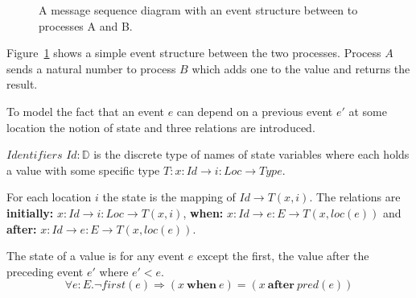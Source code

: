 \begin{figure}
  \center
  \label{fig:sequence}
  \caption{A message sequence diagram with an event structure between to
    processes A and B.}
\end{figure}

Figure~\ref{fig:sequence} shows a simple event structure between the two
processes. Process $A$ sends a natural number to process $B$ which adds
one to the value and returns the result.

To model the fact that an event $e$ can depend on a previous event $e'$ at
some location the notion of state and three relations are introduced.~\cite{bickford2005causal}

\begin{defi}
  $Identifiers$ $Id:\mathbb{D}$ is the discrete type of names of state variables where each
  holds a value with some specific type $T:x:Id\rightarrow i:Loc\rightarrow Type$.
\end{defi}

\begin{defi}
  For each location $i$ the state is the mapping of $Id\rightarrow T(x,i)$.
  The relations are \textbf{initially:} $x:Id\rightarrow i:Loc\rightarrow T(x,i)$,
  \textbf{when:} $x:Id\rightarrow e:E\rightarrow T(x,loc(e))$ and \textbf{after:} $x:Id\rightarrow e:E\rightarrow T(x,loc(e))$.
\end{defi}

\begin{axiom}
  The state of a value is for any event $e$ except the first, the value after
  the preceding event $e'$ where $e'<e$.
  \[\forall e:E.\neg first(e)\Rightarrow (x\ \textbf{when}\ e) = (x\ \textbf{after}\ pred(e))\]
\end{axiom}

